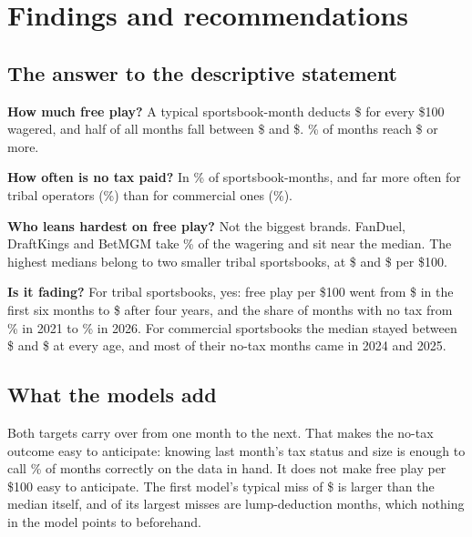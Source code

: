 \section{Findings and recommendations}\label{sec:findings}

\subsection*{The answer to the descriptive statement}

\textbf{How much free play?} A typical sportsbook-month deducts \$ for every \$100 wagered, and half of all months fall between \$ and \$. \% of months reach \$ or more.

\textbf{How often is no tax paid?} In \% of sportsbook-months, and far more often for tribal operators (\%) than for commercial ones (\%).

\textbf{Who leans hardest on free play?} Not the biggest brands. FanDuel, DraftKings and BetMGM take \% of the wagering and sit near the median. The highest medians belong to two smaller tribal sportsbooks, at \$ and \$ per \$100.

\textbf{Is it fading?} For tribal sportsbooks, yes: free play per \$100 went from \$ in the first six months to \$ after four years, and the share of months with no tax from \% in 2021 to \% in 2026. For commercial sportsbooks the median stayed between \$ and \$ at every age, and most of their no-tax months came in 2024 and 2025.

\subsection*{What the models add}

Both targets carry over from one month to the next. That makes the no-tax outcome easy to anticipate: knowing last month's tax status and size is enough to call \% of months correctly on the data in hand. It does not make free play per \$100 easy to anticipate. The first model's typical miss of \$ is larger than the median itself, and  of its  largest misses are lump-deduction months, which nothing in the model points to beforehand.

